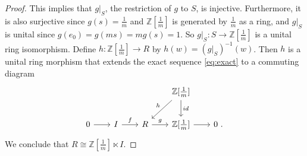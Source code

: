 \documentclass[10pt,a4paper]{amsart}
\newcommand{\Z}{\mathbb{Z}}
\begin{document}
\begin{proof}
This implies that $g|_S$, the restriction of $g$ to $S$, is injective. Furthermore, it is also surjective since $g(s)=\frac1m$ and $\Z[\frac1m]$ is generated by $\frac1m$ as a ring, and $g|_S$ is unital since $g(e_0)=g(ms)=mg(s)=1$.
So $g|_S \colon S \to \Z[\frac1m]$ is a unital ring isomorphism.
Define $h \colon \Z[\frac1m] \to R$ by $h(w)=(g|_S)^{-1}(w)$. Then $h$ is a unital ring morphism that extends the exact sequence \eqref{eq:exact} to a commuting diagram
$$\begin{tikzcd}[sep=20pt]
& & & \Z[\frac1m] & \\
0 & I & R & \Z[\frac1m] & 0 \ .
\arrow[from=2-1, to=2-2]
\arrow["f", from=2-2, to=2-3]
\arrow["g", from=2-3, to=2-4]
\arrow[from=2-4, to=2-5]
\arrow["h"', from=1-4, to=2-3]
\arrow["id", from=1-4, to=2-4]
\end{tikzcd}$$
We conclude that $R \cong \Z[\frac1m] \ltimes I$.
\end{proof}
\end{document}

